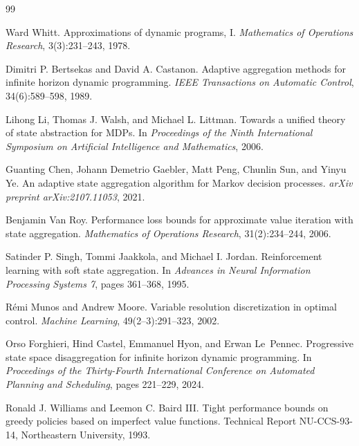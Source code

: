 \documentclass{article}
\begin{document}
\clearpage

\begin{thebibliography}{99}

Ward Whitt.
\newblock Approximations of dynamic programs, I.
\newblock \emph{Mathematics of Operations Research}, 3(3):231--243, 1978.

Dimitri P. Bertsekas and David A. Castanon.
\newblock Adaptive aggregation methods for infinite horizon dynamic
  programming.
\newblock \emph{IEEE Transactions on Automatic Control}, 34(6):589--598, 1989.

Lihong Li, Thomas J. Walsh, and Michael L. Littman.
\newblock Towards a unified theory of state abstraction for MDPs.
\newblock In \emph{Proceedings of the Ninth International Symposium on
  Artificial Intelligence and Mathematics}, 2006.

Guanting Chen, Johann Demetrio Gaebler, Matt Peng, Chunlin Sun, and Yinyu Ye.
\newblock An adaptive state aggregation algorithm for Markov decision
  processes.
\newblock \emph{arXiv preprint arXiv:2107.11053}, 2021.

Benjamin Van Roy.
\newblock Performance loss bounds for approximate value iteration with state
  aggregation.
\newblock \emph{Mathematics of Operations Research}, 31(2):234--244, 2006.

Satinder P. Singh, Tommi Jaakkola, and Michael I. Jordan.
\newblock Reinforcement learning with soft state aggregation.
\newblock In \emph{Advances in Neural Information Processing Systems 7}, pages
  361--368, 1995.

R\'emi Munos and Andrew Moore.
\newblock Variable resolution discretization in optimal control.
\newblock \emph{Machine Learning}, 49(2--3):291--323, 2002.

Orso Forghieri, Hind Castel, Emmanuel Hyon, and Erwan Le~Pennec.
\newblock Progressive state space disaggregation for infinite horizon dynamic
  programming.
\newblock In \emph{Proceedings of the Thirty-Fourth International Conference on
  Automated Planning and Scheduling}, pages 221--229, 2024.

Ronald J. Williams and Leemon C. Baird III.
\newblock Tight performance bounds on greedy policies based on imperfect value
  functions.
\newblock Technical Report NU-CCS-93-14, Northeastern University, 1993.


\end{thebibliography}
\end{document}
